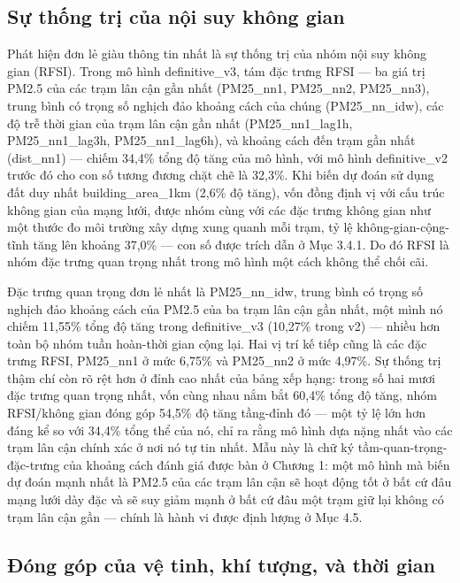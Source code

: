 \subsection{Sự thống trị của nội suy không gian}

Phát hiện đơn lẻ giàu thông tin nhất là sự thống trị của nhóm nội suy không gian (RFSI). Trong mô hình definitive\_v3, tám đặc trưng RFSI --- ba giá trị PM2.5 của các trạm lân cận gần nhất (PM25\_nn1, PM25\_nn2, PM25\_nn3), trung bình có trọng số nghịch đảo khoảng cách của chúng (PM25\_nn\_idw), các độ trễ thời gian của trạm lân cận gần nhất (PM25\_nn1\_lag1h, PM25\_nn1\_lag3h, PM25\_nn1\_lag6h), và khoảng cách đến trạm gần nhất (dist\_nn1) --- chiếm 34,4\% tổng độ tăng của mô hình, với mô hình definitive\_v2 trước đó cho con số tương đương chặt chẽ là 32,3\%. Khi biến dự đoán sử dụng đất duy nhất building\_area\_1km (2,6\% độ tăng), vốn đồng định vị với cấu trúc không gian của mạng lưới, được nhóm cùng với các đặc trưng không gian như một thước đo môi trường xây dựng xung quanh mỗi trạm, tỷ lệ không-gian-cộng-tĩnh tăng lên khoảng 37,0\% --- con số được trích dẫn ở Mục 3.4.1. Do đó RFSI là nhóm đặc trưng quan trọng nhất trong mô hình một cách không thể chối cãi.

Đặc trưng quan trọng đơn lẻ nhất là PM25\_nn\_idw, trung bình có trọng số nghịch đảo khoảng cách của PM2.5 của ba trạm lân cận gần nhất, một mình nó chiếm 11,55\% tổng độ tăng trong definitive\_v3 (10,27\% trong v2) --- nhiều hơn toàn bộ nhóm tuần hoàn-thời gian cộng lại. Hai vị trí kế tiếp cũng là các đặc trưng RFSI, PM25\_nn1 ở mức 6,75\% và PM25\_nn2 ở mức 4,97\%. Sự thống trị thậm chí còn rõ rệt hơn ở đỉnh cao nhất của bảng xếp hạng: trong số hai mươi đặc trưng quan trọng nhất, vốn cùng nhau nắm bắt 60,4\% tổng độ tăng, nhóm RFSI/không gian đóng góp 54,5\% độ tăng tầng-đỉnh đó --- một tỷ lệ lớn hơn đáng kể so với 34,4\% tổng thể của nó, chỉ ra rằng mô hình dựa nặng nhất vào các trạm lân cận chính xác ở nơi nó tự tin nhất. Mẫu này là chữ ký tầm-quan-trọng-đặc-trưng của khoảng cách đánh giá được bàn ở Chương 1: một mô hình mà biến dự đoán mạnh nhất là PM2.5 của các trạm lân cận sẽ hoạt động tốt ở bất cứ đâu mạng lưới dày đặc và sẽ suy giảm mạnh ở bất cứ đâu một trạm giữ lại không có trạm lân cận gần --- chính là hành vi được định lượng ở Mục 4.5.

\subsection{Đóng góp của vệ tinh, khí tượng, và thời gian}

